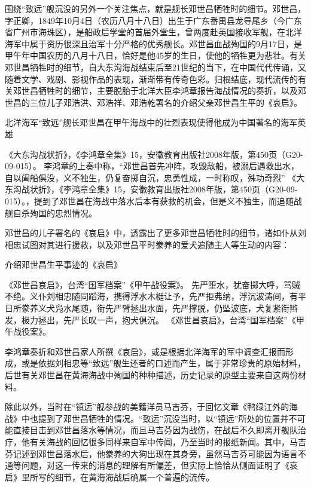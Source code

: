 \documentclass[12pt,UTF8]{ctexbook}
\begin{document}
围绕“致远”舰沉没的另外一个关注焦点，就是舰长邓世昌牺牲时的细节。邓世昌，字正卿，1849年10月4日（农历八月十八日）出生于广东番禺县龙导尾乡（今广东省广州市海珠区），是船政后学堂的首届外堂生，曾两度赴英国接收军舰，在北洋海军中属于资历很深且治军十分严格的优秀舰长。邓世昌血战殉国的9月17日，是甲午年中国农历的八月十八日，恰好是他45岁的生日，使他的牺牲更为悲壮。有关邓世昌牺牲时的细节，自大东沟海战结束后至21世纪的当下，在中国代代传诵，又随着文学、戏剧、影视作品的表现，渐渐带有传奇色彩。归根结底，现代流传的有关邓世昌牺牲时的细节，主要脱胎于北洋大臣李鸿章报告海战情况的奏折，以及邓世昌的三位儿子邓浩洪、邓浩祥、邓浩乾署名的介绍父亲邓世昌生平的《哀启》。


北洋海军“致远”舰长邓世昌在甲午海战中的壮烈表现使得他成为中国著名的海军英雄

《大东沟战状折》，《李鸿章全集》15，安徽教育出版社2008年版，第450页（G20-09-015）。
李鸿章的上奏中称，“邓世昌首先冲阵，攻毁敌船，被溺后遇救出水，自以阖船俱没，义不独生，仍复奋掷自沉，忠勇性成，一时称叹，殊功奇烈” 《大东沟战状折》，《李鸿章全集》15，安徽教育出版社2008年版，第450页（G20-09-015）。，提到了邓世昌在海战中落水后本有获救的机会，但是义不独生，而追随战舰自杀殉国的忠烈情况。

邓世昌的儿子署名的《哀启》中，透露出了更多邓世昌牺牲时的细节，诸如仆从刘相忠试图对其进行援救，以及邓世昌平时豢养的爱犬追随主人等生动的内容：


介绍邓世昌生平事迹的《哀启》

《邓世昌哀启》，台湾“国军档案”《甲午战役案》。
先严堕水，犹奋掷大呼，骂贼不绝。义仆刘相忠随同蹈海，携得浮水木梃让予，先严拒弗纳，浮沉波涛间，有平日所豢养义犬凫水尾随，衔先严臂拯出水面，先严撑脱，仍坠波底，犬复紧衔辫发，极力拯出，先严长叹一声，抱犬俱沉。 《邓世昌哀启》，台湾“国军档案”《甲午战役案》。

李鸿章奏折和邓世昌家人所撰《哀启》，或是根据北洋海军的军中调查汇报而形成，或是依据刘相忠等“致远”舰生还者的口述而产生，属于非常珍贵的原始材料，后世有关邓世昌在黄海海战中殉国的种种描述，历史记录的原型主要来自这两份材料。

除此以外，当时在“镇远”舰参战的美籍洋员马吉芬，于回忆文章《鸭绿江外的海战》中也提到了邓世昌牺牲的情况。“致远”沉没当时，以“镇远”所处的位置并不可能直接目击到邓世昌落水等情况，而且马吉芬因为战伤，在战后不久即离开舰队治疗，他有关海战的回忆很多同样来自军中传闻，乃至当时的报纸新闻。其中，马吉芬记述到邓世昌落水后，他豢养的大狗出现在其身旁，虽然马吉芬可能因为语言不通等问题，对这一传来的消息的理解有所偏差，但实际上恰恰从侧面证明了《哀启》里所写的细节，在黄海海战后确属一个普遍的流传。
\end{document}
